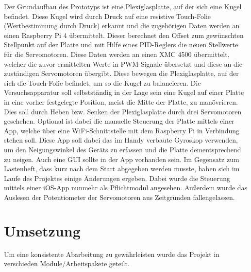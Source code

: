 \documentclass[12pt,a4paper,bibliography=totoc,listof=totoc]{scrartcl}
\begin{document}
Der Grundaufbau des Prototyps ist eine Plexiglasplatte, auf der sich 
eine Kugel befindet. Diese Kugel wird durch Druck auf eine resistive Touch-Folie (Wertbestimmung durch 
Druck) erkannt und die zugehörigen Daten werden an einen Raspberry Pi 4 übermittelt. Dieser berechnet
den Offset zum gewünschten Stellpunkt auf der Platte und mit Hilfe eines PID-Reglers die neuen Stellwerte 
für die Servomotoren. Diese Daten werden an einen XMC 4500 übermittelt, welcher die zuvor ermittelten Werte 
in PWM-Signale übersetzt und diese an die zuständigen Servomotoren übergibt. Diese bewegen die 
Plexiglasplatte, auf der sich die Touch-Folie befindet, um so die Kugel zu balancieren.
Die Versuchsapparatur soll selbstständig in der Lage sein eine Kugel auf einer Platte in eine vorher 
festgelegte Position, meist die Mitte der Platte, zu manövrieren. Dies soll durch Heben bzw. Senken der 
Plexiglasplatte durch drei Servomotoren geschehen. Optional ist dabei die manuelle Steuerung der 
Platte mittels einer App, welche über eine WiFi-Schnittstelle mit dem Raspberry Pi in Verbindung stehen 
soll. Diese App soll dabei das im Handy verbaute Gyroskop verwenden, um den Neigungswinkel des Geräts zu 
erfassen und die Platte dementsprechend zu neigen. Auch eine GUI sollte in der App vorhanden sein.
\newline Im Gegensatz zum Lastenheft, dass kurz nach dem Start abgegeben werden musste, haben sich im 
Laufe des Projektes einige Änderungen ergeben. Dabei wurde die Steuerung mittels einer iOS-App nunmehr 
als Pflichtmodul angesehen. Außerdem wurde das Auslesen der Potentiometer der Servomotoren aus Zeitgründen 
fallengelassen.
\pagebreak
\section {Umsetzung}
Um eine konsistente Abarbeitung zu gewährleisten wurde das Projekt in verschieden Module/Arbeitspakete 
geteilt.
\end{document}
